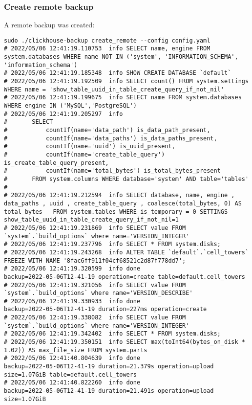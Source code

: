 \subsubsection{Create remote backup}
\label{sec:org237f76e}
A remote backup was created:
\begin{verbatim}
sudo ./clickhouse-backup create_remote --config config.yaml
# 2022/05/06 12:41:19.110753  info SELECT name, engine FROM system.databases WHERE name NOT IN ('system', 'INFORMATION_SCHEMA', 'information_schema')
# 2022/05/06 12:41:19.185348  info SHOW CREATE DATABASE `default`
# 2022/05/06 12:41:19.192509  info SELECT count() FROM system.settings WHERE name = 'show_table_uuid_in_table_create_query_if_not_nil'
# 2022/05/06 12:41:19.199675  info SELECT name FROM system.databases WHERE engine IN ('MySQL','PostgreSQL')
# 2022/05/06 12:41:19.205297  info
# 		SELECT
# 			countIf(name='data_path') is_data_path_present,
# 			countIf(name='data_paths') is_data_paths_present,
# 			countIf(name='uuid') is_uuid_present,
# 			countIf(name='create_table_query') is_create_table_query_present,
# 			countIf(name='total_bytes') is_total_bytes_present
# 		FROM system.columns WHERE database='system' AND table='tables'
#
# 2022/05/06 12:41:19.212594  info SELECT database, name, engine , data_paths , uuid , create_table_query , coalesce(total_bytes, 0) AS total_bytes   FROM system.tables WHERE is_temporary = 0 SETTINGS show_table_uuid_in_table_create_query_if_not_nil=1
# 2022/05/06 12:41:19.231869  info SELECT value FROM `system`.`build_options` where name='VERSION_INTEGER'
# 2022/05/06 12:41:19.237796  info SELECT * FROM system.disks;
# 2022/05/06 12:41:19.243268  info ALTER TABLE `default`.`cell_towers` FREEZE WITH NAME '8fac6ff911f04cf68521c2d87f778dd7';
# 2022/05/06 12:41:19.320599  info done                      backup=2022-05-06T12-41-19 operation=create table=default.cell_towers
# 2022/05/06 12:41:19.321056  info SELECT value FROM `system`.`build_options` where name='VERSION_DESCRIBE'
# 2022/05/06 12:41:19.330933  info done                      backup=2022-05-06T12-41-19 duration=227ms operation=create
# 2022/05/06 12:41:19.338082  info SELECT value FROM `system`.`build_options` where name='VERSION_INTEGER'
# 2022/05/06 12:41:19.342402  info SELECT * FROM system.disks;
# 2022/05/06 12:41:19.350151  info SELECT max(toInt64(bytes_on_disk * 1.02)) AS max_file_size FROM system.parts
# 2022/05/06 12:41:40.804639  info done                      backup=2022-05-06T12-41-19 duration=21.379s operation=upload size=1.07GiB table=default.cell_towers
# 2022/05/06 12:41:40.822260  info done                      backup=2022-05-06T12-41-19 duration=21.491s operation=upload size=1.07GiB
\end{verbatim}

